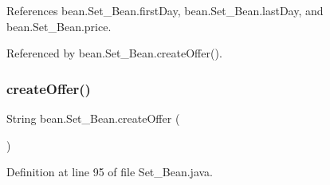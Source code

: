 References bean.\+Set\+\_\+\+Bean.\+first\+Day, bean.\+Set\+\_\+\+Bean.\+last\+Day, and bean.\+Set\+\_\+\+Bean.\+price.



Referenced by bean.\+Set\+\_\+\+Bean.\+create\+Offer().

\mbox{\label{classbean_1_1Set__Bean_a465bd2dc79465be5933720eadd23d137}} 
\subsubsection{\texorpdfstring{createOffer()}{createOffer()}}
{\footnotesize\ttfamily String bean.\+Set\+\_\+\+Bean.\+create\+Offer (\begin{DoxyParamCaption}{ }\end{DoxyParamCaption})}



Definition at line 95 of file Set\+\_\+\+Bean.\+java.


